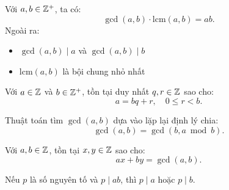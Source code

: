 \documentclass[../imo-training-open-book.tex]{subfiles}
\begin{document}
\vspace{1em}

\begin{theorem}
    \label{theorem:gcd-lcm-properties}
    Với \( a, b \in \mathbb Z^+ \), ta có:
    \[
        \gcd(a, b) \cdot \mathrm{lcm}(a, b) = ab.
    \]
    Ngoài ra:
    \begin{itemize}[topsep=0pt, itemsep=0pt]
        \item \( \gcd(a, b) \mid a \) và \( \gcd(a, b) \mid b \)
        \item \( \mathrm{lcm}(a, b) \) là bội chung nhỏ nhất
    \end{itemize}
\end{theorem}

\vspace{1em}

\begin{theorem}
    \label{theorem:euclidean-division}
    Với \( a \in \mathbb Z \) và \( b \in \mathbb Z^+ \), tồn tại duy nhất \( q, r \in \mathbb Z \) sao cho:
    \[
        a = bq + r,\quad 0 \le r < b.
    \]
\end{theorem}

\vspace{1em}

\begin{theorem}
    \label{theorem:euclidean-algorithm}
    Thuật toán tìm \( \gcd(a, b) \) dựa vào lặp lại định lý chia:
    \[
        \gcd(a, b) = \gcd(b, a \bmod b).
    \]
\end{theorem}

\vspace{1em}

\begin{theorem}
    \label{theorem:bezout}
    Với \( a, b \in \mathbb Z \), tồn tại \( x, y \in \mathbb Z \) sao cho:
    \[
        ax + by = \gcd(a, b).
    \]
\end{theorem}

\vspace{1em}

\begin{theorem}
    \label{theorem:prime-divides-product}
    Nếu \( p \) là số nguyên tố và \( p \mid ab \), thì \( p \mid a \) hoặc \( p \mid b \).
\end{theorem}
\end{document}
